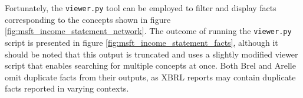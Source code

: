 Fortunately, the \texttt{viewer.py} tool can be employed to filter and display facts corresponding to the concepts shown in figure \ref{fig:msft_income_statement_network}.  
The outcome of running the \texttt{viewer.py} script is presented in figure \ref{fig:msft_income_statement_facts},  
although it should be noted that this output is truncated and uses a slightly modified viewer script that enables searching for multiple concepts at once.
Both Brel and Arelle omit duplicate facts from their outputs, as XBRL reports may contain duplicate facts reported in varying contexts.



